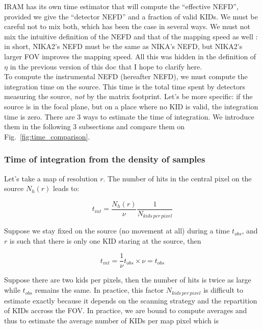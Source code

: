 IRAM has its own time estimator that will compute the ``effective NEFD'',
provided we give the ``detector NEFD'' and a fraction of valid KIDs. We must be
careful not to mix both, which has been the case in several ways. We must not
mix the intuitive definition of the NEFD and that of the mapping speed as well :
in short, NIKA2's NEFD must be the same as NIKA's NEFD, but NIKA2's larger FOV
improves the mapping speed. All this was hidden in the definition of $\eta$ in
the previous version of this doc that I hope to clarify here.\\

To compute the instrumental NEFD (hereafter NEFD), we must compute the
integration time on the source. This time is the total time spent by detectors
measuring the source, \emph{not} by the matrix footprint. Let's be more
specific: if the source is in the focal plane, but on a place where no KID is
valid, the integration time is zero. There are 3 ways to estimate the time of
integration. We introduce them in the following 3 subsections and compare them
on Fig.~\ref{fig:time_comparison}.

\subsubsection{Time of integration from the density of samples}

Let's take a map of resolution $r$. The number of hits in the central pixel on
the source $N_h(r)$ leads to:

\begin{equation}
t_{int} = \frac{N_h(r)}{\nu}\frac{1}{N_{kids\,per\,pixel}}
\end{equation}

Suppose we stay fixed on the source (no movement at all) during a time $t_{obs}$, and $r$ is such that
there is only one KID staring at the source, then

\begin{equation}
t_{int} = \frac{1}{\nu}t_{obs}\times\nu = t_{obs}
\end{equation}

Suppose there are two kids per pixels, then the number of hits is twice as large
while $t_{obs}$ remains the same. In practice, this factor
$N_{kids\,per\,pixel}$ is difficult to estimate exactly because it depends on the
scanning strategy and the repartition of KIDs accross the FOV. In practice, we
are bound to compute averages and thus to estimate the average number of KIDs
per map pixel which is 

